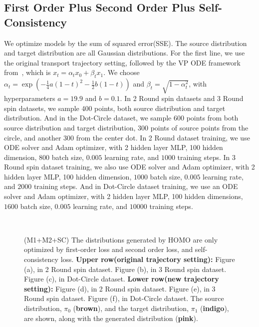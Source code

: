 \subsection{First Order Plus Second Order Plus Self-Consistency}\label{sec:app:3rd_first_order_plus_second_order_plus_self_consistency}
We optimize models by the sum of squared error(SSE). The source distribution and target distribution are all Gaussian distributions. For the first line, we use the original transport trajectory setting, followed by the VP ODE framework from~\cite{rectified_flow}, which is $x_t = \alpha_t x_0 + \beta_t x_1$. We choose $\alpha_t = \exp(-\frac{1}{4} a(1-t)^2 - \frac{1}{2} b(1-t))$ and $\beta_t = \sqrt{1 - \alpha_t^2}$, with hyperparameters $a = 19.9$ and $b = 0.1$. In 2 Round spin datasets and 3 Round spin datasets, we sample 400 points, both source distribution and target distribution. And in the Dot-Circle dataset, we sample 600 points from both source distribution and target distribution, 300 points of source points from the circle, and another 300 from the center dot. In 2 Round dataset training, we use ODE solver and Adam optimizer, with 2 hidden layer MLP, 100 hidden dimension, $800$ batch size, $0.005$ learning rate, and $1000$ training steps. In 3 Round spin dataset training, we also use ODE solver and Adam optimizer, with 2 hidden layer MLP, 100 hidden dimension, $1000$ batch size, $0.005$ learning rate, and $2000$ training steps. And in Dot-Circle dataset training, we use an ODE solver and Adam optimizer, with 2 hidden layer MLP, 100 hidden dimensions, $1600$ batch size, $0.005$ learning rate, and $10000$ training steps. 
\begin{figure}[!ht]
\centering
{}
 \\
\caption{
(M1+M2+SC)
The distributions generated by HOMO are only optimized by first-order loss and second order loss, and self-consistency loss. 
\textbf{Upper row(original trajectory setting):}
Figure (a), in 2 Round spin dataset. Figure (b), in 3 Round spin dataset. 
Figure (c), in Dot-Circle dataset. 
\textbf{Lower row(new trajectory setting):}
Figure (d), in 2 Round spin dataset. 
Figure (e), in 3 Round spin dataset. 
Figure (f), in Dot-Circle dataset. 
The source distribution, $\pi_0$ ({\textbf{brown}}), and the target distribution, $\pi_1$ ({\textbf{indigo}}), are shown, along with the generated distribution ({\textbf{pink}}). 
}
\label{fig:3rd_frist_order_plus_second_order_plus_self_consistency}
\end{figure}

